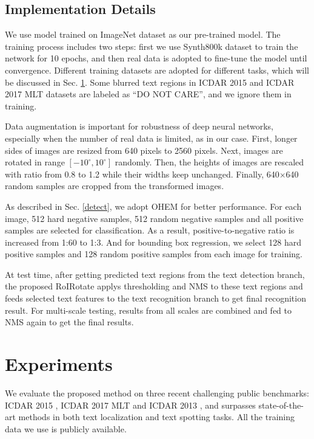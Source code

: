 \documentclass[10pt,twocolumn,letterpaper]{article}
\begin{document}
\subsection{Implementation Details}
\label{train}
We use model trained on ImageNet dataset \cite{krizhevsky2012imagenet} as our pre-trained model. The training process includes two steps: first we use Synth800k dataset \cite{gupta2016synthetic} to train the network for 10 epochs, and then real data is adopted to fine-tune the model until convergence. Different training datasets are adopted for different tasks, which will be discussed in Sec. \ref{exper}. Some blurred text regions in ICDAR 2015 and ICDAR 2017 MLT datasets are labeled as ``DO NOT CARE'', and we ignore them in training.

Data augmentation is important for robustness of deep neural networks, especially when the number of real data is limited, as in our case. First, longer sides of images are resized from 640 pixels to 2560 pixels. Next, images are rotated in range $ [-10^\circ, 10^\circ] $ randomly. Then, the heights of images are rescaled with ratio from 0.8 to 1.2 while their widths keep unchanged. Finally, 640$\times$640 random samples are cropped from the transformed images.

As described in Sec. \ref{detect}, we adopt OHEM for better performance. For each image, 512 hard negative samples, 512 random negative samples and all positive samples are selected for classification. As a result, positive-to-negative ratio is increased from 1:60 to 1:3. And for bounding box regression, we select 128 hard positive samples and 128 random positive samples from each image for training.

At test time, after getting predicted text regions from the text detection branch, the proposed RoIRotate applys thresholding and NMS to these text regions and feeds selected text features to the text recognition branch to get final recognition result. For multi-scale testing, results from all scales are combined and fed to NMS again to get the final results.
\section{Experiments}
\label{exper}

We evaluate the proposed method on three recent challenging public benchmarks: ICDAR 2015 \cite{karatzas2015icdar15}, ICDAR 2017 MLT \cite{icdar17} and ICDAR 2013 \cite{karatzas2013icdar}, and surpasses state-of-the-art methods in both text localization and text spotting tasks. All the training data we use is publicly available.
\end{document}
